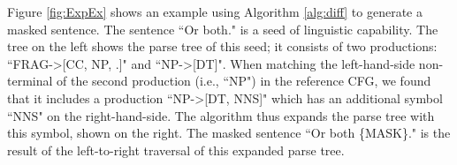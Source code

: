 Figure \ref{fig:ExpEx} shows an example using Algorithm \ref{alg:diff}
to generate a masked sentence. The sentence ``Or both." is a seed of
 linguistic capability.    The tree on
the left shows the parse tree of this seed; it consists of two
productions: ``FRAG->[CC, NP, .]" and ``NP->[DT]".  When matching the
left-hand-side non-terminal of the second production (i.e., ``NP") in
the reference CFG, we found that it includes a production ``NP->[DT,
  NNS]" which has an additional symbol ``NNS" on the right-hand-side.
The algorithm thus expands the parse tree with this symbol, shown on
the right.  The masked sentence ``Or both \{MASK\}." is the result of
the left-to-right traversal of this expanded parse tree.


